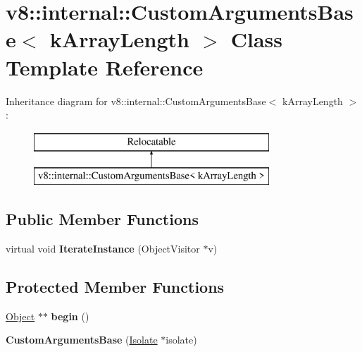 \hypertarget{classv8_1_1internal_1_1_custom_arguments_base}{}\section{v8\+:\+:internal\+:\+:Custom\+Arguments\+Base$<$ k\+Array\+Length $>$ Class Template Reference}
\label{classv8_1_1internal_1_1_custom_arguments_base}
Inheritance diagram for v8\+:\+:internal\+:\+:Custom\+Arguments\+Base$<$ k\+Array\+Length $>$\+:\begin{figure}[H]
\begin{center}
\leavevmode
\includegraphics[height=2.000000cm]{classv8_1_1internal_1_1_custom_arguments_base}
\end{center}
\end{figure}
\subsection*{Public Member Functions}
\begin{DoxyCompactItemize}
\item 
virtual void {\bfseries Iterate\+Instance} (Object\+Visitor $\ast$v)\hypertarget{classv8_1_1internal_1_1_custom_arguments_base_a906d0eea154ca3abda0979512657c8d4}{}\label{classv8_1_1internal_1_1_custom_arguments_base_a906d0eea154ca3abda0979512657c8d4}

\end{DoxyCompactItemize}
\subsection*{Protected Member Functions}
\begin{DoxyCompactItemize}
\item 
\hyperlink{classv8_1_1internal_1_1_object}{Object} $\ast$$\ast$ {\bfseries begin} ()\hypertarget{classv8_1_1internal_1_1_custom_arguments_base_a98ea9f40f92ccb6ce53a96f1e919a622}{}\label{classv8_1_1internal_1_1_custom_arguments_base_a98ea9f40f92ccb6ce53a96f1e919a622}

\item 
{\bfseries Custom\+Arguments\+Base} (\hyperlink{classv8_1_1internal_1_1_isolate}{Isolate} $\ast$isolate)\hypertarget{classv8_1_1internal_1_1_custom_arguments_base_a9ecca64feb2b74edd6d49116ea6f46b5}{}\label{classv8_1_1internal_1_1_custom_arguments_base_a9ecca64feb2b74edd6d49116ea6f46b5}

\end{DoxyCompactItemize}
